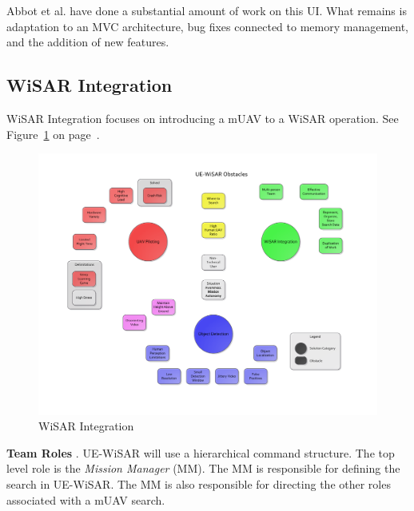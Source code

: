 \documentclass[12pt]{IEEEtran}
\begin{document}
Abbot et al. have done a substantial amount of work on this UI.  What remains is
adaptation to an MVC architecture, bug fixes connected to memory management, and
the addition of new features.

\subsection{WiSAR Integration}
WiSAR Integration focuses on introducing a mUAV to a
WiSAR operation.  See Figure~\ref{fig:wisarintegrationmap} on
page~\pageref{fig:wisarintegrationmap}.

\begin{figure}[htp]
	\vspace{-90pt}
	\hspace{-80pt}
	\includegraphics[keepaspectratio=true, width=\paperheight,
	height=\paperheight, page=2, angle=90, scale=0.95,
	trim=10 0 10 0]{obstacle_solution_map.pdf}
	\caption{WiSAR Integration}
	\label{fig:wisarintegrationmap}
\end{figure}

\textbf{Team Roles} \cite{goodrich2008supporting,adams2009cognitive,goodrich2007using}.  UE-WiSAR will use a hierarchical command structure.
The top level role is the \emph{Mission Manager} (MM).  The MM is responsible
for defining the search in UE-WiSAR.  The MM is also responsible for directing
the other roles associated with a mUAV search.
\end{document}
